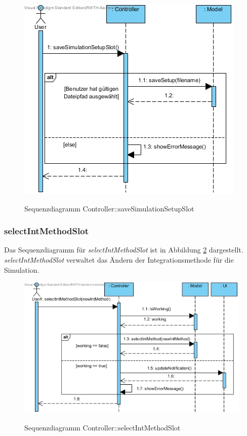 \begin{figure}[H]
	\centering
	\includegraphics[scale=.75]{Bilder/Controller__saveSimulationSetupSlot().jpg}\\
	\caption{Sequenzdiagramm Controller::saveSimulationSetupSlot}
	\label{Sequenzdiagramm Controller::saveSimulationSetupSlot}
\end{figure}
\newpage
\subsubsection*{selectIntMethodSlot}

Das Sequenzdiagramm für \emph{selectIntMethodSlot} ist in Abbildung \ref{Sequenzdiagramm Controller::selectIntMethodSlot} dargestellt. \emph{selectIntMethodSlot} verwaltet das Ändern der Integrationsmethode für die Simulation.

\begin{figure}[H]
	\centering
	\includegraphics[scale=.7]{Bilder/Controller__selectIntMethodSlot().jpg}\\
	\caption{Sequenzdiagramm Controller::selectIntMethodSlot}
	\label{Sequenzdiagramm Controller::selectIntMethodSlot}
\end{figure}

